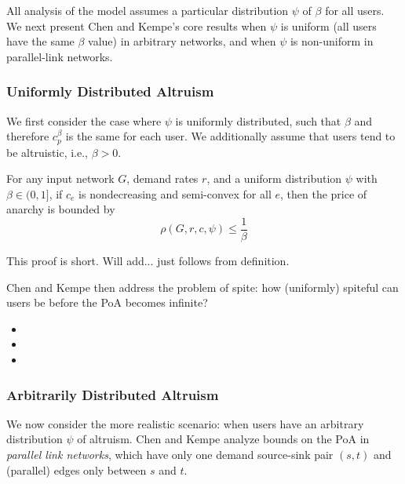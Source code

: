 All analysis of the model assumes a particular distribution $\psi$ of $\beta$ for all users. We next present Chen and Kempe's core results when $\psi$ is uniform (all users have the same $\beta$ value) in arbitrary networks, and when $\psi$ is non-uniform in parallel-link networks.


\subsubsection{Uniformly Distributed Altruism}
We first consider the case where $\psi$ is uniformly distributed, such that $\beta$ and therefore $c^\beta_p$ is the same for each user. We additionally assume that users tend to be altruistic, i.e., $\beta > 0$.
\begin{theorem}
For any input network $G$, demand rates $r$, and 
a uniform distribution $\psi$ with $\beta \in (0, 1]$,
if $c_e$ is nondecreasing and semi-convex for all $e$,
    then the price of anarchy is bounded by 
    $$\rho(G,r,c,\psi) \le \frac{1}{\beta}$$
\end{theorem}

\begin{proof-sketch}
This proof is short. Will add... just follows from definition.
\end{proof-sketch}

Chen and Kempe then address the problem of spite: how (uniformly) spiteful can users be before the PoA becomes infinite?
\begin{itemize}
\item{}
\item{}
\item{}
\end{itemize}

\subsubsection{Arbitrarily Distributed Altruism}
We now consider the more realistic scenario: when users have an arbitrary distribution $\psi$ of altruism.
Chen and Kempe analyze bounds on the PoA in \emph{parallel link networks}, which have 
only one demand source-sink pair $(s,t)$ and (parallel) edges only between $s$ and $t$.


